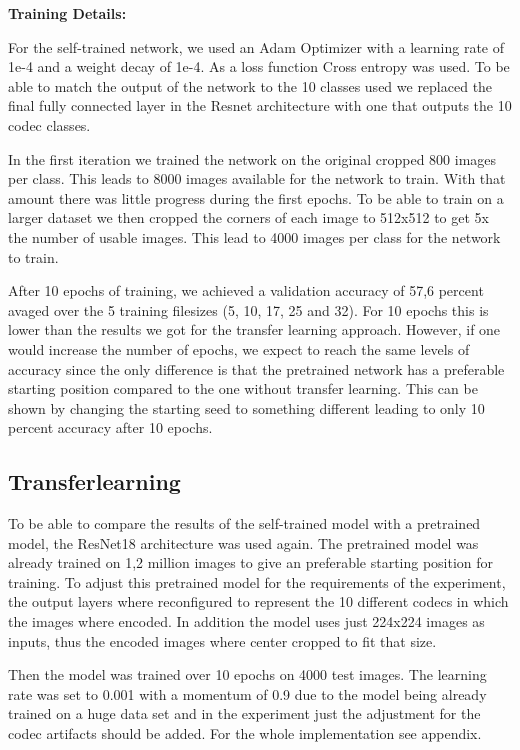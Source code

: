 \noindent
\textbf{Training Details:}

\noindent
For the self-trained network, we used an Adam Optimizer with a learning rate of 1e-4 and a weight decay of 1e-4. As a loss function Cross entropy was used. To be able to match the output of the network to the 10 classes used we replaced the final fully connected layer in the Resnet architecture with one that outputs the 10 codec classes.

\noindent
In the first iteration we trained the network on the original cropped 800 images per class. This leads to 8000 images available for the network to train. With that amount there was little progress during the first epochs. To be able to train on a larger dataset we then cropped the corners of each image to 512x512 to get 5x the number of usable images. This lead to 4000 images per class for the network to train.

\noindent
After 10 epochs of training, we achieved a validation accuracy of 57,6 percent avaged over the 5 training filesizes (5, 10, 17, 25 and 32). For 10 epochs this is lower than the results we got for the transfer learning approach. However, if one would increase the number of epochs, we expect to reach the same levels of accuracy since the only difference is that the pretrained network has a preferable starting position compared to the one without transfer learning. This can be shown by changing the starting seed to something different leading to only 10 percent accuracy after 10 epochs.

\subsection{Transferlearning}
To be able to compare the results of the self-trained model with a pretrained model, the ResNet18 architecture was used again. The pretrained model was already trained on 1,2 million images to give an preferable starting position for training. To adjust this pretrained model for the requirements of the experiment, the output layers where reconfigured to represent the 10 different codecs in which the images where encoded.
In addition the model uses just 224x224 images as inputs, thus the encoded images where center cropped to fit that size.



\noindent
Then the model was trained over 10 epochs on 4000 test images. The learning rate was set to 0.001 with a momentum of 0.9 due to the model being already trained on a huge data set and in the experiment just the adjustment for the codec artifacts should be added. For the whole implementation see appendix.

